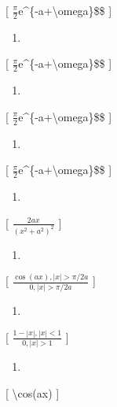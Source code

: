 \documentclass[
]{article}
\providecommand{\tightlist}{%
  \setlength{\itemsep}{0pt}\setlength{\parskip}{0pt}}
\begin{document}
{{{{[} \(\frac{\pi}{2}\)e\^{}\{-a+\textbackslash omega\}\$\$ {]}

\begin{enumerate}
\def\labelenumi{\arabic{enumi}.}
\setcounter{enumi}{12}
\tightlist
\item
\end{enumerate}

{[} \(\frac{\pi}{2}\)e\^{}\{-a+\textbackslash omega\}\$\$ {]}

\begin{enumerate}
\def\labelenumi{\arabic{enumi}.}
\setcounter{enumi}{13}
\tightlist
\item
\end{enumerate}

{[} \(\frac{\pi}{2}\)e\^{}\{-a+\textbackslash omega\}\$\$ {]}

\begin{enumerate}
\def\labelenumi{\arabic{enumi}.}
\setcounter{enumi}{14}
\tightlist
\item
\end{enumerate}

{[} \(\frac{\pi}{2}\)e\^{}\{-a+\textbackslash omega\}\$\$ {]}

\begin{enumerate}
\def\labelenumi{\arabic{enumi}.}
\setcounter{enumi}{15}
\tightlist
\item
\end{enumerate}

{[} \(\frac{2ax}{(x^2+a^2)^2}\) {]}

\begin{enumerate}
\def\labelenumi{\arabic{enumi}.}
\setcounter{enumi}{16}
\tightlist
\item
\end{enumerate}

{[} \(\frac{\cos(ax), |x| > \pi/2a}{0, |x| > \pi/2a}\) {]}

\begin{enumerate}
\def\labelenumi{\arabic{enumi}.}
\setcounter{enumi}{17}
\tightlist
\item
\end{enumerate}

{[} \(\frac{1-|x|, |x| < 1}{0, |x| > 1}\) {]}

\begin{enumerate}
\def\labelenumi{\arabic{enumi}.}
\setcounter{enumi}{18}
\tightlist
\item
\end{enumerate}

{[} \textbackslash cos(ax) {]}

}}}
\end{document}
